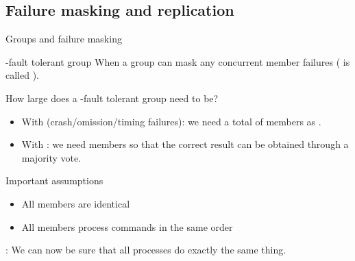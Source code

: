 \subsection{Failure masking and replication}
\begin{slide}{Groups and failure masking}
  \begin{block}{-fault tolerant group}
    When a group can mask any  concurrent member failures ( is called ).
  \end{block}
  \onslide
  \begin{alertblock}{How large does a -fault tolerant group need to be?}
    \begin{itemize}
    \item With  (crash/omission/timing failures): we need a total of 
      members as .
    \item With : we need  members so that the correct result can be
      obtained through a majority vote.
    \end{itemize}
  \end{alertblock}
  \onslide
  \begin{block}{Important assumptions}
    \begin{itemize}\tightlist
    \item All members are identical
    \item All members process commands in the same order 
    \end{itemize}
    : We can now be sure that all processes do exactly the same thing.
  \end{block}
\end{slide}
